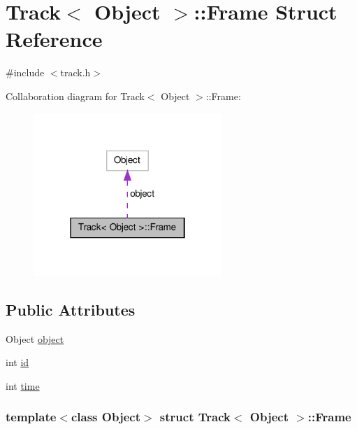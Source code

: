 \hypertarget{struct_track_1_1_frame}{\section{\-Track$<$ \-Object $>$\-:\-:\-Frame \-Struct \-Reference}
\label{struct_track_1_1_frame}
}


{\ttfamily \#include $<$track.\-h$>$}



\-Collaboration diagram for \-Track$<$ \-Object $>$\-:\-:\-Frame\-:
\nopagebreak
\begin{figure}[H]
\begin{center}
\leavevmode
\includegraphics[width=202pt]{struct_track_1_1_frame__coll__graph}
\end{center}
\end{figure}
\subsection*{\-Public \-Attributes}
\begin{DoxyCompactItemize}
\item 
\-Object \hyperlink{struct_track_1_1_frame_a6bbfe33bfab1011aaddd49d35e0ecfb4}{object}
\item 
int \hyperlink{struct_track_1_1_frame_a00cdf6a5e1c6eae134547cd386c8ebd3}{id}
\item 
int \hyperlink{struct_track_1_1_frame_a72677957f8d88952d44074e0af30b624}{time}
\end{DoxyCompactItemize}
\subsubsection*{template$<$class Object$>$ struct Track$<$ Object $>$\-::\-Frame}



